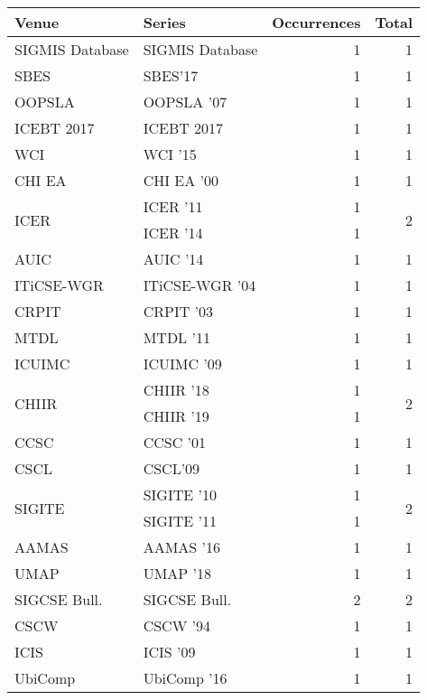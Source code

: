 \begin{table*}[t]
\begin{tabular}{llrr}
Venue & Series & Occurrences & Total\\\hline
\multirow{1}{*}{SIGMIS Database} & SIGMIS Database & 1 & \multirow{1}{*}{1}\\
\multirow{1}{*}{SBES} & SBES'17 & 1 & \multirow{1}{*}{1}\\
\multirow{1}{*}{OOPSLA } & OOPSLA '07 & 1 & \multirow{1}{*}{1}\\
\multirow{1}{*}{ICEBT 2017} & ICEBT 2017 & 1 & \multirow{1}{*}{1}\\
\multirow{1}{*}{WCI } & WCI '15 & 1 & \multirow{1}{*}{1}\\
\multirow{1}{*}{CHI EA } & CHI EA '00 & 1 & \multirow{1}{*}{1}\\
\multirow{2}{*}{ICER } & ICER '11 & 1 & \multirow{2}{*}{2}\\
& ICER '14 & 1 &\\
\multirow{1}{*}{AUIC } & AUIC '14 & 1 & \multirow{1}{*}{1}\\
\multirow{1}{*}{ITiCSE-WGR } & ITiCSE-WGR '04 & 1 & \multirow{1}{*}{1}\\
\multirow{1}{*}{CRPIT } & CRPIT '03 & 1 & \multirow{1}{*}{1}\\
\multirow{1}{*}{MTDL } & MTDL '11 & 1 & \multirow{1}{*}{1}\\
\multirow{1}{*}{ICUIMC } & ICUIMC '09 & 1 & \multirow{1}{*}{1}\\
\multirow{2}{*}{CHIIR } & CHIIR '18 & 1 & \multirow{2}{*}{2}\\
& CHIIR '19 & 1 &\\
\multirow{1}{*}{CCSC } & CCSC '01 & 1 & \multirow{1}{*}{1}\\
\multirow{1}{*}{CSCL} & CSCL'09 & 1 & \multirow{1}{*}{1}\\
\multirow{2}{*}{SIGITE } & SIGITE '10 & 1 & \multirow{2}{*}{2}\\
& SIGITE '11 & 1 &\\
\multirow{1}{*}{AAMAS } & AAMAS '16 & 1 & \multirow{1}{*}{1}\\
\multirow{1}{*}{UMAP } & UMAP '18 & 1 & \multirow{1}{*}{1}\\
\multirow{1}{*}{SIGCSE Bull.} & SIGCSE Bull. & 2 & \multirow{1}{*}{2}\\
\multirow{1}{*}{CSCW } & CSCW '94 & 1 & \multirow{1}{*}{1}\\
\multirow{1}{*}{ICIS } & ICIS '09 & 1 & \multirow{1}{*}{1}\\
\multirow{1}{*}{UbiComp } & UbiComp '16 & 1 & \multirow{1}{*}{1}\\

\end{tabular}
\end{table*}
